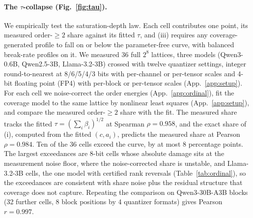 \paragraph{The $\tau$-collapse (Fig.~\ref{fig:tau}).} We empirically test the saturation-depth law.
Each cell contributes one point, its measured order-$\ge 2$ share
against its fitted $\tau$, and \propfive(iii) requires any coverage-generated profile to fall on or
below the parameter-free
curve, with balanced break-rate profiles on it.
We measured 36 full $2^8$ lattices, three models
(Qwen3-0.6B, Qwen2.5-3B, Llama-3.2-3B) crossed with twelve quantizer settings, integer
round-to-nearest at 8/6/5/4/3 bits with per-channel or per-tensor scales and 4-bit floating point
(FP4) with per-block or per-tensor scales (App.~\ref{app:setup}). For each cell we noise-correct the
order energies (App.~\ref{app:ordinal}), fit the coverage model to the same lattice by nonlinear
least squares (App.~\ref{app:setup}), and compare the measured order-$\ge 2$ share with the fit. The
measured share tracks the fitted $\tau = (\sum_i\beta_i)^{1/2}$ at
Spearman $\rho = 0.958$, and the exact share of \propfive(i), computed from the fitted $(c,a_i)$,
predicts the measured share at Pearson $\rho = 0.984$. Ten of the 36 cells exceed the curve, by at
most 8 percentage points. The largest exceedances are 8-bit cells whose absolute damage sits at the
measurement noise floor, where the noise-corrected share is unstable, and Llama-3.2-3B cells, the one
model with certified rank reversals (Table~\ref{tab:ordinal}), so the exceedances are consistent with
share noise plus the residual structure that coverage does not capture.
Repeating the comparison on Qwen3-30B-A3B
blocks (32 further cells, 8 block positions by 4 quantizer formats) gives Pearson $r = 0.997$.

